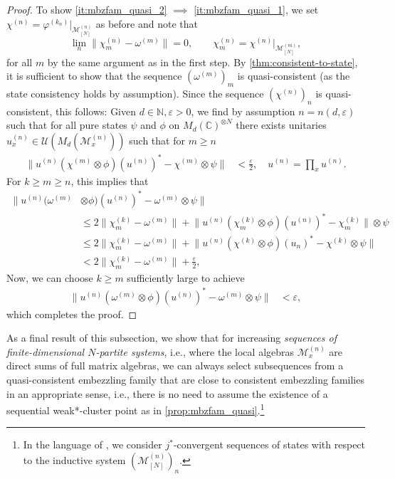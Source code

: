 \documentclass[a4paper, 10pt, onecolumn, accepted=2025-07-22]{quantumarticle}
\theoremstyle{definition}
\newcommand{\norm}[1]{\lVert #1\rVert}
\newcommand{\ox}{\otimes}
\newcommand{\mc}{\mathcal}
\newcommand{\eps}{\varepsilon}
\newcommand{\up}[1]{^{(#1)}}
\def\CC{{\mathbb C}}
\def\M{{\mc M}}
\def\U{{\mc U}}
\def\NN{{\mathbb N}}
\newcommand*{\1}{\text{\usefont{U}{bbold}{m}{n}1}}
\begin{document}
\begin{proof}
To show \cref{it:mbzfam_quasi_2} $\implies$ \cref{it:mbzfam_quasi_1}, we set $\chi\up{n} = \varphi\up{k_{n}}|_{\M\up{n}_{[N]}}$ as before and note that 
\begin{equation}
\lim_{n}\norm{\chi\up{n}_m-\omega\up{m}}=0,\qquad \chi\up{n}_m = \chi\up{n}|_{\M\up{m}_{[N]}},
\end{equation}
for all $m$ by the same argument as in the first step. By \cref{thm:consistent-to-state}, it is sufficient to show that the sequence $(\omega\up{m})_{m}$ is quasi-consistent (as the state consistency holds by assumption). Since the sequence $(\chi\up{n})_{n}$ is quasi-consistent, this follows: Given $d\in\NN, \eps>0$, we find by assumption $n = n(d,\eps)$ such that for all pure states $\psi$ and $\phi$ on $M_{d}(\CC)^{\ox N}$ there exists unitaries $u\up{n}_x\in\U(M_{d}(\M\up{n}_x))$ such that for $m\geq n$
\begin{align*}
\norm{u\up{n}(\chi\up{m}\ox\phi)(u\up{n})^{*}-\chi\up{m}\ox\psi} & < \tfrac{\eps}{2},\quad u\up{n} = \prod_x u\up{n}.
\end{align*}
For $k\geq m\geq n$, this implies that
\begin{align*}
\|u\up{n}(\omega\up{m}&\ox\phi)(u\up{n})^{*}-\omega\up{m}\ox\psi\|\\& \leq 2 \norm{\chi\up{k}_m\!-\!\omega\up{m}} + \norm{u\up{n}(\chi\up{k}_m\!\ox\phi)(u\up{n})^{*}-\chi\up{k}_{m}}\ox\psi \\
& \leq 2 \norm{\chi\up{k}_{m}\!-\!\omega\up{m}} + \norm{u\up{n}(\chi\up{k}\ox\phi)(u_{n})^{*}-\chi\up{k}\ox\psi} \\
& < 2 \norm{\chi\up{k}_m\!-\!\omega\up{m}} + \tfrac{\eps}{2},
\end{align*}
Now, we can choose $k\geq m$ sufficiently large to achieve
\begin{align*}
\norm{u\up{n}(\omega\up{m}\ox\phi)(u\up{n})^{*}-\omega\up {m}\ox\psi} & < \eps,
\end{align*}
which completes the proof.
\end{proof}

As a final result of this subsection, we show that for increasing \emph{sequences of finite-dimensional $N$-partite systems}, i.e., where the local algebras $\M\up{n}_x$ are direct sums of full matrix algebras, we can always select subsequences from a quasi-consistent embezzling family that are close to consistent embezzling families in an appropriate sense, i.e., there is no need to assume the existence of a sequential weak*-cluster point as in \cref{prop:mbzfam_quasi}.\footnote{In the language of \cite{vanluijk2024jdyn}, we consider $j^{*}$-convergent sequences of states with respect to the inductive system $(\M\up{n}_{[N]})_{n}$.}
\end{document}
